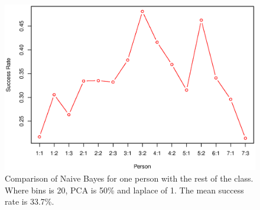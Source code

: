 \begin{figure}[H]
\centering
\includegraphics[width = \textwidth]{graphics/graph_baye_comparison}
\caption{Comparison of Naive Bayes for one person with the rest of the class.
Where bins is 20, PCA is 50\% and laplace of 1. The mean success rate is 33.7\%.}
\label{fig:comp_naiveBayes}
\end{figure}






